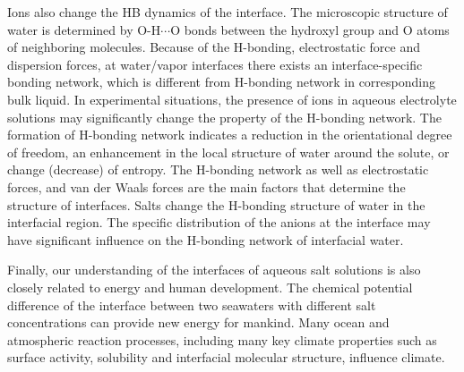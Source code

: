 Ions also change the HB dynamics of the interface.
The microscopic structure of water is determined by O-H$\cdots$O bonds between the hydroxyl group 
and O atoms of neighboring molecules. 
Because of the H-bonding, electrostatic force and dispersion forces, 
at water/vapor interfaces there exists an interface-specific bonding network, 
which is different from H-bonding network in corresponding bulk liquid\cite{Allongue96,Velasco-Velez14}.
In experimental situations, the presence of ions in aqueous 
electrolyte solutions may significantly change the property of the H-bonding network. 
The formation of H-bonding network indicates a reduction in the orientational degree of freedom, 
an enhancement in the local structure of water around the solute, or change (decrease) of entropy\cite{Frank45a, Frank45b,Frank45c}.
%
The H-bonding network\cite{Eisenberg1969,Speedy1976,Poole1994,Soper2008b,Ball2001,Nilsson2011,Pettersson2015} as well as electrostatic forces, 
and van der Waals forces are the main factors that determine the structure of interfaces. 
Salts change the H-bonding structure of water in the interfacial region\cite{EAR04,McLain2006,Ball2008}. 
The specific distribution of the anions at the interface may have significant influence on the H-bonding network of interfacial water\cite{Morita2008}.


Finally, our understanding of the interfaces of aqueous salt solutions is also closely related to energy and human development. 
The chemical potential difference of the interface between two seawaters with different salt concentrations can provide new energy for mankind\cite{Pattle1954,Loeb1976}. 
Many ocean and atmospheric reaction processes, including many key climate properties such as surface activity, 
solubility and interfacial molecular structure, influence climate\cite{Schill2015,Cochran2017}. 

